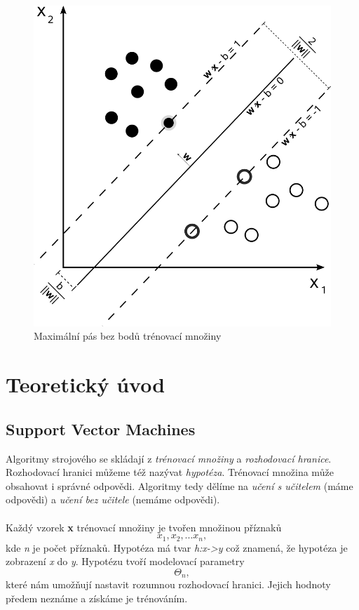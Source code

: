 \documentclass[a4]{article}
\begin{document}
\begin{figure}[!ht]
	\centering
		\includegraphics[width=\textwidth]{images/svm_vectors}
	\caption{Maximální pás bez bodů trénovací množiny \cite{svm_vectors}}
	\label{fig:svm_vectors}
\end{figure}

\section{Teoretický úvod}

\subsection{Support Vector Machines}
Algoritmy strojového se skládají z \textit{trénovací množiny} a \textit{rozhodovací hranice}. Rozhodovací hranici můžeme též nazývat \textit{hypotéza}. Trénovací množina může obsahovat i správné odpovědi. Algoritmy tedy dělíme na \textit{učení s učitelem} (máme odpovědi) a \textit{učení bez učitele} (nemáme odpovědi).
\\\\
Každý vzorek \textbf{x} trénovací množiny je tvořen množinou příznaků $${x_1,x_2,...x_n},$$kde \textit{n} je počet příznaků. Hypotéza má tvar \textit{h:x->y} což znamená, že hypotéza je zobrazení \textit{x} do \textit{y}. Hypotézu tvoří modelovací parametry $$\Theta_{n},$$které nám umožňují nastavit rozumnou rozhodovací hranici. Jejich hodnoty předem neznáme a získáme je trénováním.
\end{document}
